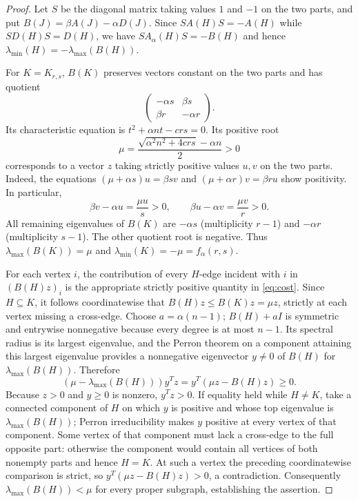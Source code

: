 \documentclass[11pt]{amsart}
\theoremstyle{definition}
\newcommand{\Aa}{A_{\alpha}}
\newcommand{\lam}{\lambda_{\min}}
\begin{document}
\begin{proof}
Let $S$ be the diagonal matrix taking values $1$ and $-1$ on the two parts, and put $B(J)=\beta A(J)-\alpha D(J)$. Since $S A(H)S=-A(H)$ while $S D(H)S=D(H)$, we have $S\Aa(H)S=-B(H)$ and hence $\lam(H)=-\lambda_{\max}(B(H))$.

For $K=K_{r,s}$, $B(K)$ preserves vectors constant on the two parts and has quotient
\[
 \begin{pmatrix}-\alpha s&\beta s\\ \beta r&-\alpha r\end{pmatrix}.
\]
Its characteristic equation is $t^2+\alpha nt-crs=0$. Its positive root
\begin{equation}\label{eq:mu}
 \mu=\frac{\sqrt{\alpha^2n^2+4crs}-\alpha n}{2}>0
\end{equation}
corresponds to a vector $z$ taking strictly positive values $u,v$ on the two parts. Indeed, the equations $(\mu+\alpha s)u=\beta sv$ and $(\mu+\alpha r)v=\beta ru$ show positivity. In particular,
\begin{equation}\label{eq:cost}
 \beta v-\alpha u=\frac{\mu u}{s}>0,
 \qquad \beta u-\alpha v=\frac{\mu v}{r}>0.
\end{equation}
All remaining eigenvalues of $B(K)$ are $-\alpha s$ (multiplicity $r-1$) and $-\alpha r$ (multiplicity $s-1$). The other quotient root is negative. Thus $\lambda_{\max}(B(K))=\mu$ and $\lam(K)= -\mu=f_\alpha(r,s)$.

For each vertex $i$, the contribution of every $H$-edge incident with $i$ in $(B(H)z)_i$ is the appropriate strictly positive quantity in \eqref{eq:cost}. Since $H\subseteq K$, it follows coordinatewise that $B(H)z\le B(K)z=\mu z$, strictly at each vertex missing a cross-edge. Choose $a=\alpha(n-1)$; $B(H)+aI$ is symmetric and entrywise nonnegative because every degree is at most $n-1$. Its spectral radius is its largest eigenvalue, and the Perron theorem on a component attaining this largest eigenvalue provides a nonnegative eigenvector $y\ne0$ of $B(H)$ for $\lambda_{\max}(B(H))$. Therefore
\[
 (\mu-\lambda_{\max}(B(H)))y^Tz
 =y^T(\mu z-B(H)z)\ge0.
\]
Because $z>0$ and $y\ge0$ is nonzero, $y^Tz>0$. If equality held while $H\ne K$, take a connected component of $H$ on which $y$ is positive and whose top eigenvalue is $\lambda_{\max}(B(H))$; Perron irreducibility makes $y$ positive at every vertex of that component. Some vertex of that component must lack a cross-edge to the full opposite part: otherwise the component would contain all vertices of both nonempty parts and hence $H=K$. At such a vertex the preceding coordinatewise comparison is strict, so $y^T(\mu z-B(H)z)>0$, a contradiction. Consequently $\lambda_{\max}(B(H))<\mu$ for every proper subgraph, establishing the assertion.
\end{proof}
\end{document}
